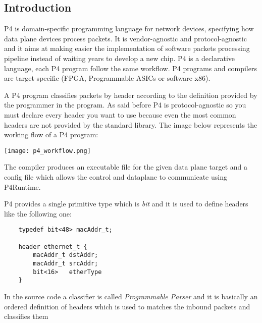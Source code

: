 \documentclass[../sn.tex]{subfiles}
\begin{document}
\subsection{Introduction}
P4 is domain-specific programming language for network devices, specifying how data plane devices process packets.
It is vendor-agnostic and protocol-agnostic and it aims at making easier the implementation of software packets processing pipeline instead of waiting years to develop a new chip.
P4 is a declarative language, each P4 program follow the same workflow.
P4 programs and compilers are target-specific (FPGA, Programmable ASICs or software x86).

A P4 program classifies packets by header according to the definition provided by the programmer in the program.
As said before P4 is protocol-agnostic so you must declare every header you want to use because even the most common headers are not provided by the standard library.
The image below represents the working flow of a P4 program:
\begin{center}
    \texttt{[image: p4\_workflow.png]}
\end{center}
The compiler produces an executable file for the given data plane target and a config file which allows the control and dataplane to communicate using P4Runtime.

P4 provides a single primitive type which is \emph{bit} and it is used to define headers like the following one:
\begin{lstlisting}
    typedef bit<48> macAddr_t;

    header ethernet_t {
        macAddr_t dstAddr;
        macAddr_t srcAddr;
        bit<16>   etherType
    }
\end{lstlisting}
In the source code a classifier is called \emph{Programmable Parser} and it is basically an ordered definition of headers which is used to matches the inbound packets and classifies them

\begin{lstlisting}

\end{lstlisting}
\end{document}
